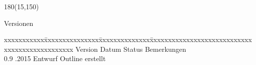 \begin{textblock}{180}(15,150)
\color{black}
\begin{huge}
Versionen
\end{huge}
\vspace{10mm}

\fontsize{10pt}{18pt}\selectfont
\begin{tabbing}
xxxxxxxxxxx\=xxxxxxxxxxxxxxx\=xxxxxxxxxxxxxx\=xxxxxxxxxxxxxxxxxxxxxxxxxxxxxxxxxxxxxxxxxxxxxxx \kill
Version	\> Datum	\> Status		\> Bemerkungen		\\
0.9	.2015	\> Entwurf		\> Outline erstellt	\\
\end{tabbing}

\end{textblock}
